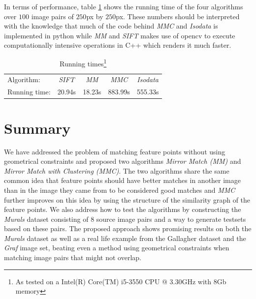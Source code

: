 \documentclass[12pt,journal,compsoc]{IEEEtran}
\begin{document}
In terms of performance, table \ref{table:running_times} shows the 
running time of the four algorithms over $100$ image pairs of $250$px by 
$250$px. These numbers should be interpreted with the knowledge that 
much of the code behind \emph{MMC} and \emph{Isodata} is implemented in 
python while \emph{MM} and \emph{SIFT} makes use of opencv to execute 
computationally intensive operations in C++ which renders it much 
faster.
%
\begin{savenotes}
\begin{table}
	\centering
	\small
\begin{tabular}{l*{4}{c}}
	Algorithm: & \emph{SIFT} & \emph{MM} & \emph{MMC} & \emph{Isodata} 
	\\
	\noalign{\smallskip} 
	Running time: & 20.94s & 18.23s & 883.99s & 555.33s \\
\end{tabular}
\caption{Running times\footnote{As tested on a Intel(R) Core(TM) i5-3550 
CPU @ 3.30GHz with 8Gb memory}}
\label{table:running_times}
\end{table}
\end{savenotes}
%
\section{Summary}
We have addressed the problem of matching feature points without using 
geometrical constraints and proposed two algorithms \emph{Mirror Match 
(MM)} and \emph{Mirror Match with Clustering (MMC)}. The two algorithms 
share the same common idea that feature points should have better 
matches in another image than in the image they came from to be 
considered good matches and \emph{MMC} further improves on this idea by 
using the structure of the similarity graph of the feature points. We 
also address how to test the algorithms by constructing the 
\emph{Murals} dataset consisting of $8$ source image pairs and a way to 
generate testsets based on these pairs.  The proposed approach shows 
promising results on both the \emph{Murals} dataset as well as a real 
life example from the Gallagher dataset and the \emph{Graf} image set, 
beating even a method using geometrical constraints when matching image 
pairs that might not overlap.
%


\end{document}
